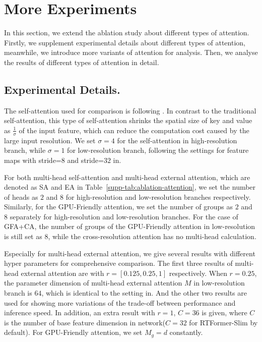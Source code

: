 \documentclass{article}
\begin{document}
\section{More Experiments}

In this section, we extend the ablation study about different types of attention. Firstly, we supplement experimental details about different types of attention, meanwhile, we introduce more variants of attention for analysis. Then, we analyse the results of different types of attention in detail.

\subsection{Experimental Details.}

The self-attention used for comparison is following \cite{xie2021segformer}. In contrast to the traditional self-attention, this type of self-attention shrinks the spatial size of key and value as $\frac{1}{\sigma}$ of the input feature, which can reduce the computation cost caused by the large input resolution. We set $\sigma=4$ for the self-attention in high-resolution branch, while $\sigma=1$ for low-resolution branch, following the settings for feature maps with stride=$8$ and stride=$32$ in\cite{xie2021segformer}.

For both multi-head self-attention and multi-head external attention, which are denoted as SA and EA in Table~\ref{supp-tab:ablation-attention}, we set the number of heads as $2$ and $8$ for high-resolution and low-resolution branches respectively. Similarly, for the GPU-Friendly attention, we set the number of groups as $2$ and $8$ separately for high-resolution and low-resolution branches. For the case of GFA+CA, the number of groups of the GPU-Friendly attention in low-resolution is still set as $8$, while the cross-resolution attention has no multi-head calculation.

Especially for multi-head external attention, we give several results with different hyper parameters for comprehensive comparison. The first three results of multi-head external attention are with $r=[0.125, 0.25, 1]$ respectively. When $r=0.25$, the parameter dimension of multi-head external attention $M$ in low-resolution branch is $64$, which is identical to the setting in\cite{guo2021beyond}. And the other two results are used for showing more variations of the trade-off between performance and inference speed. In addition, an extra result with $r=1$, $C=36$ is given, where $C$ is the number of base feature dimension in network($C=32$ for RTFormer-Slim by default). For GPU-Friendly attention, we set $M_g = d$ constantly.
\end{document}
